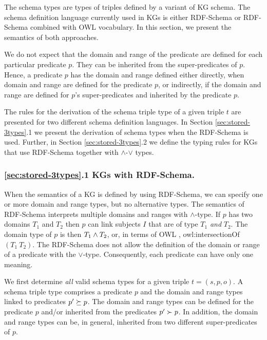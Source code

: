 \documentclass[runningheads]{llncs}
\begin{document}
The schema types are types of triples defined by a variant of KG
schema. The schema definition language currently used in KGs is either
RDF-Schema \cite{rdfschema} or RDF-Schema combined with OWL
\cite{owl2} vocabulary. In this section, we present the semantics of
both approaches.

We do not expect that the domain and range of the predicate are defined
for each particular predicate $p$. They can be inherited from the
super-predicates of $p$. Hence, a predicate $p$ has the domain and
range defined either directly, when domain and range are defined for
the predicate $p$, or indirectly, if the domain and range are defined
for $p$'s super-predicates and inherited by the predicate $p$.

The rules for the derivation of the schema triple type of a given
triple $t$ are presented for two different schema definition
languages. In Section \ref{sec:stored-3types}.1 we present the
derivation of schema types when the RDF-Schema is used. Further, in
Section \ref{sec:stored-3types}.2 we define the typing rules for
KGs that use RDF-Schema together with $\land$-$\lor$ types.






\subsubsection{\ref{sec:stored-3types}.1 KGs with RDF-Schema.}
When the semantics of a KG is defined by using RDF-Schema, we can
specify one or more domain and range types, but no alternative
types. The semantics of RDF-Schema \cite{rdfsemantics} interprets
multiple domains and ranges with $\land$-type. If $p$ has two domains
$T_1$ and $T_2$ then $p$ can link subjects $I$ that are of type $T_1$
\emph{and} $T_2$. The domain type of $p$ is then $T_1\land\/T_2$, or,
in terms of OWL \cite{owl}, owl:intersectionOf$(T_1\ T_2)$. The
RDF-Schema does not allow the definition of the domain or range of a
predicate with the $\lor$-type. Consequently, each predicate can have
only one meaning.

We first determine \emph{all} valid schema types for a given triple
$t=(s,p,o)$. A schema triple type comprises a predicate $p$ and the
domain and range types linked to predicates $p'\succeq\/p$. The domain
and range types can be defined for the predicate $p$ and/or inherited
from the predicates $p'\succ\/p$. In addition, the domain and range
types can be, in general, inherited from two different
super-predicates of $p$.
\end{document}
